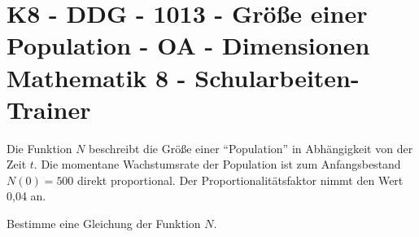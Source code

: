 \section{K8 - DDG - 1013 - Größe einer Population - OA - Dimensionen Mathematik 8 - Schularbeiten-Trainer}

\begin{beispiel}[K8 - DDG]{1}
Die Funktion $N$ beschreibt die Größe einer "`Population"' in Abhängigkeit von der Zeit $t$. Die momentane Wachstumsrate der Population ist zum Anfangsbestand $N(0)=500$ direkt proportional. Der Proportionalitätsfaktor nimmt den Wert 0,04 an.

Bestimme eine Gleichung der Funktion $N$.

\end{beispiel}